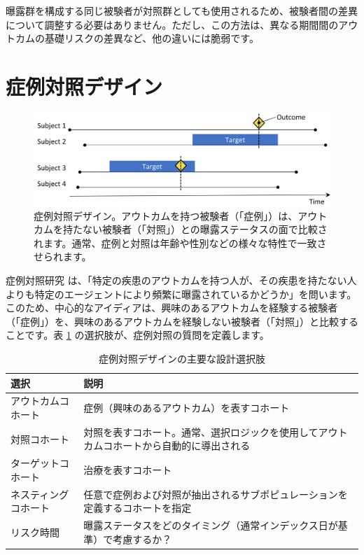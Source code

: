\documentclass[
  11pt]{book}
\theoremstyle{definition}
\theoremstyle{definition}
\theoremstyle{definition}
\theoremstyle{definition}
\theoremstyle{remark}
\begin{document}
曝露群を構成する同じ被験者が対照群としても使用されるため、被験者間の差異について調整する必要はありません。ただし、この方法は、異なる期間間のアウトカムの基礎リスクの差異など、他の違いには脆弱です。

\section{症例対照デザイン}\label{ux75c7ux4f8bux5bfeux7167ux30c7ux30b6ux30a4ux30f3}


\begin{figure}[h]

{\centering \includegraphics[width=0.9\linewidth]{images/PopulationLevelEstimation/caseControl} 

}

\caption{症例対照デザイン。アウトカムを持つ被験者（「症例」）は、アウトカムを持たない被験者（「対照」）との曝露ステータスの面で比較されます。通常、症例と対照は年齢や性別などの様々な特性で一致させられます。}\label{fig:caseControl}
\end{figure}

症例対照研究 \citep{vandenbroucke_2012} は、「特定の疾患のアウトカムを持つ人が、その疾患を持たない人よりも特定のエージェントにより頻繁に曝露されているかどうか」を問います。このため、中心的なアイディアは、興味のあるアウトカムを経験する被験者（「症例」）を、興味のあるアウトカムを経験しない被験者（「対照」）と比較することです。表 \ref{tab:ccChoices} の選択肢が、症例対照の質問を定義します。  

\begin{table}
\centering
\caption{\label{tab:ccChoices}症例対照デザインの主要な設計選択肢}
\centering
\begin{tabular}[t]{l>{\raggedright\arraybackslash}p{9cm}}
\toprule
選択 & 説明\\
\midrule
アウトカムコホート & 症例（興味のあるアウトカム）を表すコホート\\
対照コホート & 対照を表すコホート。通常、選択ロジックを使用してアウトカムコホートから自動的に導出される\\
ターゲットコホート & 治療を表すコホート\\
ネスティングコホート & 任意で症例および対照が抽出されるサブポピュレーションを定義するコホートを指定\\
リスク時間 & 曝露ステータスをどのタイミング（通常インデックス日が基準）で考慮するか？\\
\bottomrule
\end{tabular}
\end{table}
\end{document}
